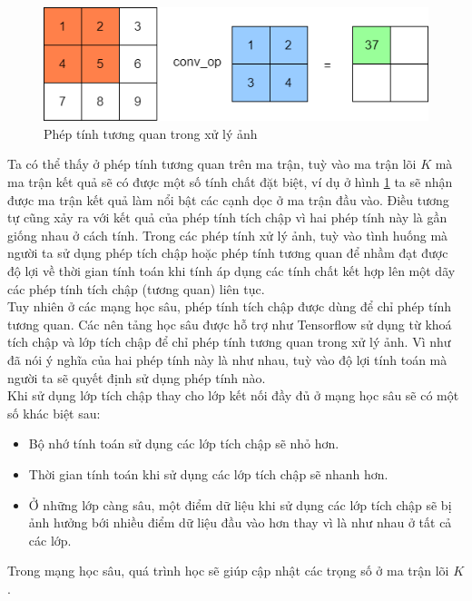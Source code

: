 \begin{figure}[h]
\centering
    \includegraphics[totalheight=2.7cm]{Images/conv.png}
    \caption{Phép tính tương quan trong xử lý ảnh}
    \label{convExample}
\end{figure}
Ta có thể thấy ở phép tính tương quan trên ma trận, tuỳ vào ma trận lõi $K$ mà ma trận kết quả sẽ có được một số tính chất đặt biệt, ví dụ ở hình \ref{convExample} ta sẽ nhận được ma trận kết quả làm nổi bật các cạnh dọc ở ma trận đầu vào. Điều tương tự cũng xảy ra với kết quả của phép tính tích chập vì hai phép tính này là gần giống nhau ở cách tính. Trong các phép tính xử lý ảnh, tuỳ vào tình huống mà người ta sử dụng phép tích chập hoặc phép tính tương quan để nhầm đạt được độ lợi về thời gian tính toán khi tính áp dụng các tính chất kết hợp lên một dãy các phép tính tích chập (tương quan) liên tục\cite{convtheorem}.\\
Tuy nhiên ở các mạng học sâu, phép tính tích chập được dùng để chỉ phép tính tương quan. Các nên tảng học sâu được hỗ trợ như Tensorflow sử dụng từ khoá tích chập và lớp tích chập để chỉ phép tính tương quan trong xử lý ảnh. Vì như đã nói ý nghĩa của hai phép tính này là như nhau, tuỳ vào độ lợi tính toán mà người ta sẽ quyết định sử dụng phép tính nào.\\
Khi sử dụng lớp tích chập thay cho lớp kết nối đầy đủ ở mạng học sâu sẽ có một số khác biệt sau:
\begin{itemize}
    \item Bộ nhớ tính toán sử dụng các lớp tích chập sẽ nhỏ hơn.
    \item Thời gian tính toán khi sử dụng các lớp tích chập sẽ nhanh hơn.
    \item Ở những lớp càng sâu, một điểm dữ liệu khi sử dụng các lớp tích chập sẽ bị ảnh hưởng bới nhiều điểm dữ liệu đầu vào hơn thay vì là như nhau ở tất cả các lớp.
\end{itemize} 
Trong mạng học sâu, quá trình học sẽ giúp cập nhật các trọng số ở ma trận lõi $K$.

